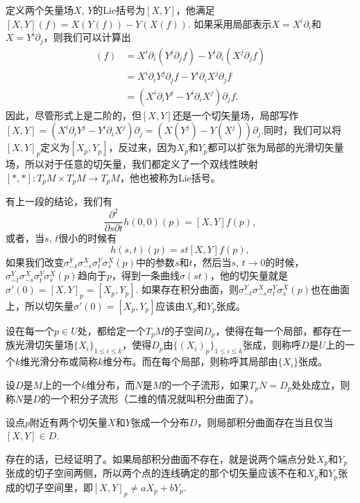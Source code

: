 \para 定义两个矢量场$X$, $Y$的Lie括号为$[X,Y]$，他满足$[X,Y](f)=X(Y(f))-Y(X(f))$. 如果采用局部表示$X=X^i\partial_i$和$X=Y^i\partial_j$，则我们可以计算出
\begin{align*}
	[X,Y](f)&=X^i\partial_i(Y^j\partial_j f)-Y^i\partial_i(X^j\partial_j f)\\
	&=X^i\partial_iY^j\partial_j f-Y^i\partial_i X^j\partial_j f\\
	&=(X^i\partial_iY^j-Y^i\partial_i X^j)\partial_jf.
\end{align*}
因此，尽管形式上是二阶的，但$[X,Y]$还是一个切矢量场，局部写作$[X,Y]=(X^i\partial_iY^j-Y^i\partial_i X^j)\partial_j=(X(Y^j)-Y(X^j))\partial_j$.同时，我们可以将$[X,Y]_p$定义为$[X_p,Y_p]$，反过来，因为$X_p$和$Y_p$都可以扩张为局部的光滑切矢量场，所以对于任意的切矢量，我们都定义了一个双线性映射$[*,*]:T_pM\times T_pM\to T_pM$，他也被称为Lie括号。

有上一段的结论，我们有
\[
	\frac{\partial^2}{\partial s\partial t} h(0,0)(p)=[X,Y]f(p),
\]
或者，当$s$, $t$很小的时候有
\[
	h(s,t)(p)=st[X,Y]f(p),
\]
如果我们改变$\sigma^Y_{-t}\sigma^X_{-s}\sigma^Y_{t}\sigma^X_{s}(p)$中的参数$s$和$t$，然后当$s$, $t\to 0$的时候，$\sigma^Y_{-t}\sigma^X_{-s}\sigma^Y_{t}\sigma^X_{s}(p)$趋向于$p$，得到一条曲线$\sigma(st)$，他的切矢量就是$\sigma'(0)=[X,Y]_p=[X_p,Y_p]$. 如果存在积分曲面，则$\sigma^Y_{-t}\sigma^X_{-s}\sigma^Y_{t}\sigma^X_{s}(p)$也在曲面上，所以切矢量$\sigma'(0)=[X_p,Y_p]$应该由$X_p$和$Y_p$张成。

\para 设在每一个$p\in U$处，都给定一个$T_pM$的子空间$D_p$，使得在每一个局部，都存在一族光滑切矢量场$\{X_i\}_{1\leq i\leq k}$，使得$D_p$由$\{(X_i)_p\}_{1\leq i\leq k}$张成，则称呼$D$是$U$上的一个$k$维光滑分布或简称$k$维分布。而在每个局部，则称呼其局部由$\{X_i\}$张成。

设$D$是$M$上的一个$k$维分布，而$N$是$M$的一个子流形，如果$T_pN=D_p$处处成立，则称$N$是$D$的一个积分子流形（二维的情况就叫积分曲面了）。

\pro 设点$p$附近有两个切矢量$X$和$Y$张成一个分布$D$，则局部积分曲面存在当且仅当$[X,Y]\in D$.


存在的话，已经证明了。如果局部积分曲面不存在，就是说两个端点分处$X_p$和$Y_p$张成的切子空间两侧，所以两个点的连线确定的那个切矢量应该不在和$X_p$和$Y_p$张成的切子空间里，即$[X,Y]_p\neq aX_p+bY_p$.

